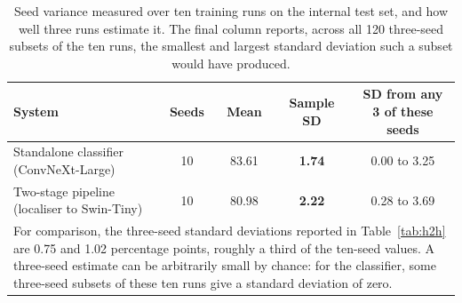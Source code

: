 \documentclass{elektr}
\newcommand{\vs}{\vspace}
\begin{document}
\begin{table}[!ht]
\caption{Seed variance measured over ten training runs on the internal test set, and how well three runs estimate it. The final column reports, across all 120 three-seed subsets of the ten runs, the smallest and largest standard deviation such a subset would have produced.}
\begin{center}
\small
\begin{tabular}{|l|c|c|c|c|}
\hline
System & Seeds & Mean & Sample SD & SD from any 3 of these seeds \\
\hline
Standalone classifier (ConvNeXt-Large) & 10 & 83.61 & \textbf{1.74} & 0.00 to 3.25 \\
Two-stage pipeline (localiser to Swin-Tiny) & 10 & 80.98 & \textbf{2.22} & 0.28 to 3.69 \\
\hline
\multicolumn{5}{|p{0.92\textwidth}|}{For comparison, the three-seed standard deviations reported in Table~\ref{tab:h2h} are 0.75 and 1.02 percentage points, roughly a third of the ten-seed values. A three-seed estimate can be arbitrarily small by chance: for the classifier, some three-seed subsets of these ten runs give a standard deviation of zero.} \\
\hline
\end{tabular}
\label{tab:seeds}
\end{center}\vs{-4mm}
\end{table}
\end{document}

